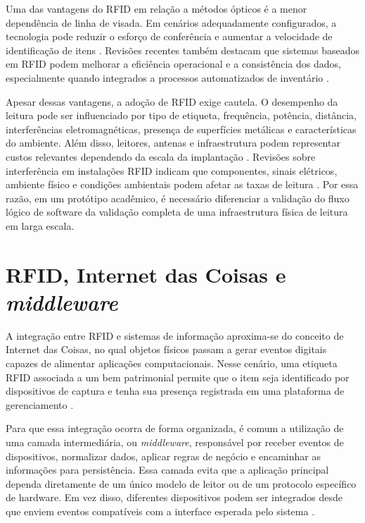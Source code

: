 Uma das vantagens do RFID em relação a métodos ópticos é a menor dependência de linha de visada. Em cenários adequadamente configurados, a tecnologia pode reduzir o esforço de conferência e aumentar a velocidade de identificação de itens \cite{alwadi2017,ting2013}. Revisões recentes também destacam que sistemas baseados em RFID podem melhorar a eficiência operacional e a consistência dos dados, especialmente quando integrados a processos automatizados de inventário \cite{budiyanto2024,mashayekhy2022}.

Apesar dessas vantagens, a adoção de RFID exige cautela. O desempenho da leitura pode ser influenciado por tipo de etiqueta, frequência, potência, distância, interferências eletromagnéticas, presença de superfícies metálicas e características do ambiente. Além disso, leitores, antenas e infraestrutura podem representar custos relevantes dependendo da escala da implantação \cite{budiyanto2024,ting2013}. Revisões sobre interferência em instalações RFID indicam que componentes, sinais elétricos, ambiente físico e condições ambientais podem afetar as taxas de leitura \cite{knapp2022}. Por essa razão, em um protótipo acadêmico, é necessário diferenciar a validação do fluxo lógico de software da validação completa de uma infraestrutura física de leitura em larga escala.

\section{RFID, Internet das Coisas e \textit{middleware}}

A integração entre RFID e sistemas de informação aproxima-se do conceito de Internet das Coisas, no qual objetos físicos passam a gerar eventos digitais capazes de alimentar aplicações computacionais. Nesse cenário, uma etiqueta RFID associada a um bem patrimonial permite que o item seja identificado por dispositivos de captura e tenha sua presença registrada em uma plataforma de gerenciamento \cite{abijaude2017}.

Para que essa integração ocorra de forma organizada, é comum a utilização de uma camada intermediária, ou \textit{middleware}, responsável por receber eventos de dispositivos, normalizar dados, aplicar regras de negócio e encaminhar as informações para persistência. Essa camada evita que a aplicação principal dependa diretamente de um único modelo de leitor ou de um protocolo específico de hardware. Em vez disso, diferentes dispositivos podem ser integrados desde que enviem eventos compatíveis com a interface esperada pelo sistema \cite{alwadi2017,razzaque2015}.

